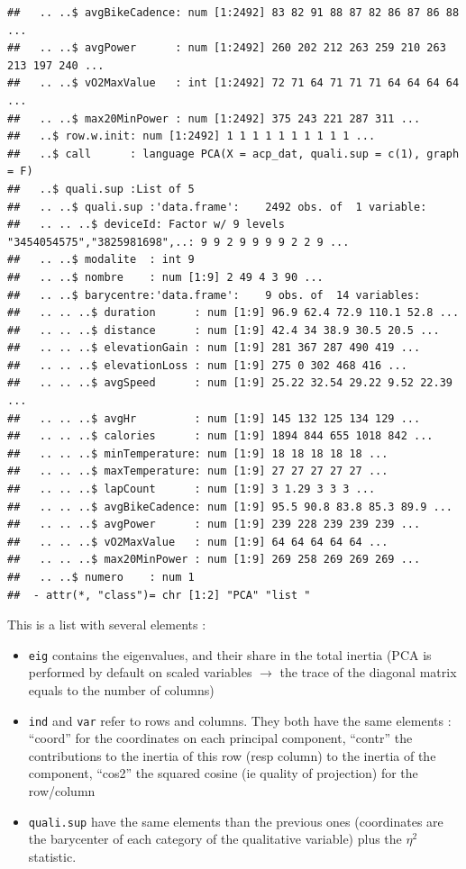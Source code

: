 \documentclass[
]{book}
\providecommand{\tightlist}{%
  \setlength{\itemsep}{0pt}\setlength{\parskip}{0pt}}
\begin{document}
\begin{verbatim}
##   .. ..$ avgBikeCadence: num [1:2492] 83 82 91 88 87 82 86 87 86 88 ...
##   .. ..$ avgPower      : num [1:2492] 260 202 212 263 259 210 263 213 197 240 ...
##   .. ..$ vO2MaxValue   : int [1:2492] 72 71 64 71 71 71 64 64 64 64 ...
##   .. ..$ max20MinPower : num [1:2492] 375 243 221 287 311 ...
##   ..$ row.w.init: num [1:2492] 1 1 1 1 1 1 1 1 1 1 ...
##   ..$ call      : language PCA(X = acp_dat, quali.sup = c(1), graph = F)
##   ..$ quali.sup :List of 5
##   .. ..$ quali.sup :'data.frame':	2492 obs. of  1 variable:
##   .. .. ..$ deviceId: Factor w/ 9 levels "3454054575","3825981698",..: 9 9 2 9 9 9 9 2 2 9 ...
##   .. ..$ modalite  : int 9
##   .. ..$ nombre    : num [1:9] 2 49 4 3 90 ...
##   .. ..$ barycentre:'data.frame':	9 obs. of  14 variables:
##   .. .. ..$ duration      : num [1:9] 96.9 62.4 72.9 110.1 52.8 ...
##   .. .. ..$ distance      : num [1:9] 42.4 34 38.9 30.5 20.5 ...
##   .. .. ..$ elevationGain : num [1:9] 281 367 287 490 419 ...
##   .. .. ..$ elevationLoss : num [1:9] 275 0 302 468 416 ...
##   .. .. ..$ avgSpeed      : num [1:9] 25.22 32.54 29.22 9.52 22.39 ...
##   .. .. ..$ avgHr         : num [1:9] 145 132 125 134 129 ...
##   .. .. ..$ calories      : num [1:9] 1894 844 655 1018 842 ...
##   .. .. ..$ minTemperature: num [1:9] 18 18 18 18 18 ...
##   .. .. ..$ maxTemperature: num [1:9] 27 27 27 27 27 ...
##   .. .. ..$ lapCount      : num [1:9] 3 1.29 3 3 3 ...
##   .. .. ..$ avgBikeCadence: num [1:9] 95.5 90.8 83.8 85.3 89.9 ...
##   .. .. ..$ avgPower      : num [1:9] 239 228 239 239 239 ...
##   .. .. ..$ vO2MaxValue   : num [1:9] 64 64 64 64 64 ...
##   .. .. ..$ max20MinPower : num [1:9] 269 258 269 269 269 ...
##   .. ..$ numero    : num 1
##  - attr(*, "class")= chr [1:2] "PCA" "list "
\end{verbatim}

This is a list with several elements :

\begin{itemize}
\tightlist
\item
  \texttt{eig} contains the eigenvalues, and their share in the total inertia (PCA is performed by default on scaled variables \(\rightarrow\) the trace of the diagonal matrix equals to the number of columns)
\item
  \texttt{ind} and \texttt{var} refer to rows and columns. They both have the same elements : ``coord'' for the coordinates on each principal component, ``contr'' the contributions to the inertia of this row (resp column) to the inertia of the component, ``cos2'' the squared cosine (ie quality of projection) for the row/column
\item
  \texttt{quali.sup} have the same elements than the previous ones (coordinates are the barycenter of each category of the qualitative variable) plus the \(\eta^2\) statistic.
\end{itemize}
\end{document}

